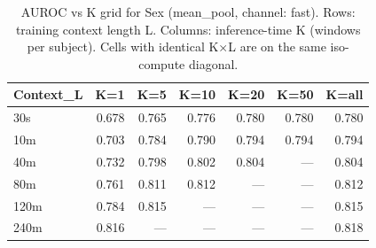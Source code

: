 \begin{table}[ht]
\centering
\caption{AUROC vs K grid for Sex (mean_pool, channel: fast). Rows: training context length L. Columns: inference-time K (windows per subject). Cells with identical K×L are on the same iso-compute diagonal.}
\label{tab:kgrid_sex_binary_mean_pool_fast}
\begin{tabular}{lrrrrrr}
\toprule
Context_L & K=1 & K=5 & K=10 & K=20 & K=50 & K=all \\
\midrule
30s & 0.678 & 0.765 & 0.776 & 0.780 & 0.780 & 0.780 \\
10m & 0.703 & 0.784 & 0.790 & 0.794 & 0.794 & 0.794 \\
40m & 0.732 & 0.798 & 0.802 & 0.804 & — & 0.804 \\
80m & 0.761 & 0.811 & 0.812 & — & — & 0.812 \\
120m & 0.784 & 0.815 & — & — & — & 0.815 \\
240m & 0.816 & — & — & — & — & 0.818 \\
\bottomrule
\end{tabular}
\end{table}